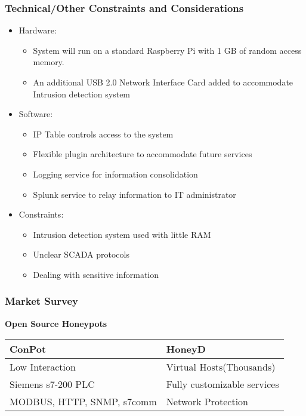 \begin{frame}
\frametitle{Technical/Other Constraints and Considerations}


\begin{itemize}
\item Hardware:
\begin{itemize}
\item System will run on a standard Raspberry Pi with 1 GB of random access memory.  
\item An additional USB 2.0 Network Interface Card added to accommodate Intrusion detection system
\end{itemize}

\item Software:
\begin{itemize}
\item IP Table controls access to the system
\item Flexible plugin architecture to accommodate future services
\item Logging service for information consolidation
\item Splunk service to relay information to IT administrator
\end{itemize}

\item Constraints:
\begin{itemize}
\item Intrusion detection system used with little RAM
\item Unclear SCADA protocols
\item Dealing with sensitive information
\end{itemize}


\end{itemize}

\end{frame}

\begin{frame}
\frametitle{Market Survey}


\begin{center}
\textbf{Open Source Honeypots}
\end{center}

\begin{tabular}{l | l}
\toprule
\textbf{ConPot} & \textbf{HoneyD} \\
\midrule
Low Interaction & Virtual Hosts(Thousands) \\
Siemens s7-200 PLC & Fully customizable services \\
MODBUS, HTTP, SNMP, s7comm & Network Protection \\
\bottomrule
\end{tabular}
\end{frame}

